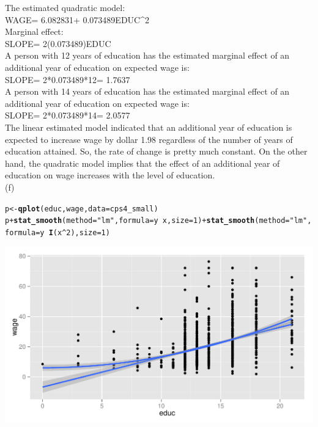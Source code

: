 \documentclass[a4paper]{article}\usepackage{graphicx, color}
\makeatletter
\def\maxwidth{ %
  \ifdim\Gin@nat@width>\linewidth
    \linewidth
  \else
    \Gin@nat@width
  \fi
}
\newcommand{\hlfunctioncall}[1]{\textcolor[rgb]{0.501960784313725,0,0.329411764705882}{\textbf{#1}}}%
\newcommand{\hlstring}[1]{\textcolor[rgb]{0.6,0.6,1}{#1}}%
\newenvironment{kframe}{%
 \def\at@end@of@kframe{}%
 \ifinner\ifhmode%
  \def\at@end@of@kframe{\end{minipage}}%
  \begin{minipage}{\columnwidth}%
 \fi\fi%
 \def\FrameCommand##1{\hskip\@totalleftmargin \hskip-\fboxsep
 \colorbox{shadecolor}{##1}\hskip-\fboxsep
     \hskip-\linewidth \hskip-\@totalleftmargin \hskip\columnwidth}%
 \MakeFramed {\advance\hsize-\width
   \@totalleftmargin\z@ \linewidth\hsize
   \@setminipage}}%
 {\par\unskip\endMakeFramed%
 \at@end@of@kframe}
\newenvironment{knitrout}{}{} %
\makeatother
\begin{document}
The estimated quadratic model:\\

WAGE= 6.082831+ 0.073489EDUC^2\\

Marginal effect:\\

SLOPE= 2(0.073489)EDUC\\

A person with 12 years of education has the estimated marginal effect of an additional
year of education on expected wage is:\\

SLOPE= 2*0.073489*12= 1.7637\\

A person with 14 years of education has the estimated marginal effect of an additional
year of education on expected wage is:\\

SLOPE= 2*0.073489*14= 2.0577\\

The linear estimated model indicated that an additional year of education is expected to increase wage by dollar 1.98 regardless of the number of years of education attained. So, the rate of change is pretty much constant. On the other hand, the quadratic model implies that the effect of an additional year of education on wage increases with the level of education.\\

(f)

\begin{knitrout}
\color{fgcolor}\begin{kframe}
\begin{alltt}
p <- \hlfunctioncall{qplot}(educ, wage, data = cps4_small)
p + \hlfunctioncall{stat_smooth}(method = \hlstring{"lm"}, formula = y ~ x, size = 1) + \hlfunctioncall{stat_smooth}(method = \hlstring{"lm"}, 
    formula = y ~ \hlfunctioncall{I}(x^2), size = 1)
\end{alltt}
\end{kframe}
\includegraphics[width=\maxwidth]{figure/unnamed-chunk-7} 

\end{knitrout}
\end{document}
